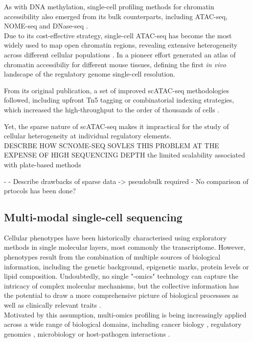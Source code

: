 As with DNA methylation, single-cell profiling methods for chromatin accessibility also emerged from its bulk counterparts, including ATAC-seq\cite{Buenrostro2015a}, NOME-seq \cite{Pott2016} and DNase-seq \cite{Jin2015}.
\\

Due to its cost-effective strategy, single-cell ATAC-seq has become the most widely used to map open chromatin regions, revealing extensive heterogeneity across different cellular populations \cite{Cusanovic2015,Cao2018,OTHERS}. In a pioneer effort \cite{Cusanovich2018} generated an atlas of chromatin accessibiliy for different mouse tissues, defining the first \textit{in vivo} landscape of the regulatory genome single-cell resolution.

From its original publication, a set of improved scATAC-seq methodologies followed, including upfront Tn5 tagging\cite{Chen2018} or combinatorial indexing strategies, which increased the high-throughput to the order of thousands of cells \cite{Cusanovich2015a}. 

Yet, the sparse nature of scATAC-seq makes it impractical for the study of cellular heterogeneity at individual regulatory elements. \\
	DESCRBE HOW SCNOME-SEQ SOVLES THIS PROBLEM AT THE EXPENSE OF HIGH SEQUENCING DEPTH
	the limited scalability associated with plate-based methods


- 
- Describe drawbacks of sparse data -> pseudobulk required
- No comparison of prtocols has been done?


\subsection{Multi-modal single-cell sequencing}

Cellular phenotypes have been historically characterised using exploratory methods in single molecular layers, most commonly the transcriptome. However, phenotypes result from the combination of multiple sources of biological information, including the genetic background, epigenetic marks, protein levels or lipid composition. Undoubtedly, no single "-omics" technology can capture the intricacy of complex molecular mechanisms, but the collective information has the potential to draw a more comprehensive picture of biological processses as well as clinically relevant traits \cite{Hasin2017,Ritchie2015}.\\
Motivated by this assumption, multi-omics profiling is being increasingly applied across a wide range of biological domains, including cancer biology \cite{Akavia2010,Gerstung2015}, regulatory genomics \cite{Chen2016}, microbiology \cite{Kim2016} or host-pathogen interactions \cite{TO-DO soderholm2016}.\\ 

